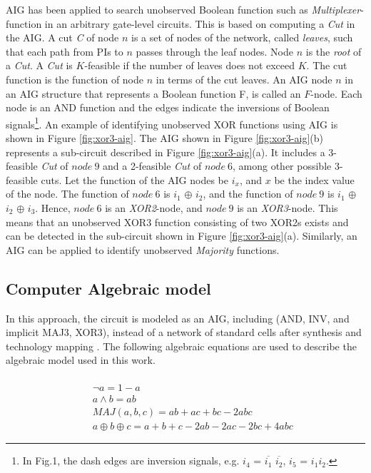 AIG has been applied to search unobserved Boolean function such as \textit{Multiplexer}-function \cite{cunxiyu:dac16} in an arbitrary gate-level circuits. This is based on computing a \textit{Cut} in the AIG. A cut \textit{C} of node $n$ is a set of nodes of the network, called \textit{leaves}, such that each path from PIs to $n$ passes through the leaf nodes. Node $n$ is the \textit{root} of a \textit{Cut}. A \textit{Cut} is $K$-feasible if the number of leaves does not exceed $K$. The cut function is the function of node $n$ in terms of the cut leaves. An AIG node $n$ in an AIG structure that represents a Boolean function F, is called an $F$-node. Each node is an AND function and the edges indicate the inversions of Boolean signals\footnote{In Fig.1, the dash edges are inversion signals, e.g. $i_4$ = $\overline{i_1}$  $\overline{i_2}$, $i_5$ = $i_1$$i_2$.}. 
%
An example of identifying unobserved XOR functions using AIG is shown in Figure \ref{fig:xor3-aig}. The AIG shown in Figure \ref{fig:xor3-aig}(b) represents a sub-circuit described in Figure \ref{fig:xor3-aig}(a). It includes a 3-feasible \textit{Cut} of $node~9$ and a 2-feasible \textit{Cut} of $node~6$, among other possible 3-feasible cuts. Let the function of the AIG nodes be $i_{x}$, and $x$ be the index value of the node. 
The function of $node~6$ is $i_1$ $\oplus$ $i_2$, and the function of $node~9$ is $i_1$ $\oplus$ $i_2$ $\oplus$ $i_3$. Hence, $node~6$ is an \textit{XOR2}-node, and $node~9$ is an \textit{XOR3}-node. This means that an unobserved XOR3 function consisting of two XOR2s exists and can be detected in the sub-circuit shown in Figure \ref{fig:xor3-aig}(a). Similarly, an AIG can be applied to identify unobserved \textit{Majority} functions.


\subsection{Computer Algebraic model}

In this approach, the circuit is modeled as an AIG, including (AND, INV, and implicit MAJ3, XOR3), instead of a network of standard cells after synthesis and technology mapping \cite{ciesielski2015verification}. The following algebraic equations are used to describe the algebraic model used in this work.

{\small
\vspace{-4mm}
\begin{equation}
     \begin{aligned}
      \text{~~} &\\
       & \neg a = 1 - a \\
       & a \wedge b = ab \\
       & MAJ(a, b, c) = ab+ac+bc - 2abc \\
       & a \oplus b \oplus c  = a + b + c - 2ab - 2ac - 2bc + 4abc
     \end{aligned}
\label{eq:boolean-poly}
\end{equation}
}

